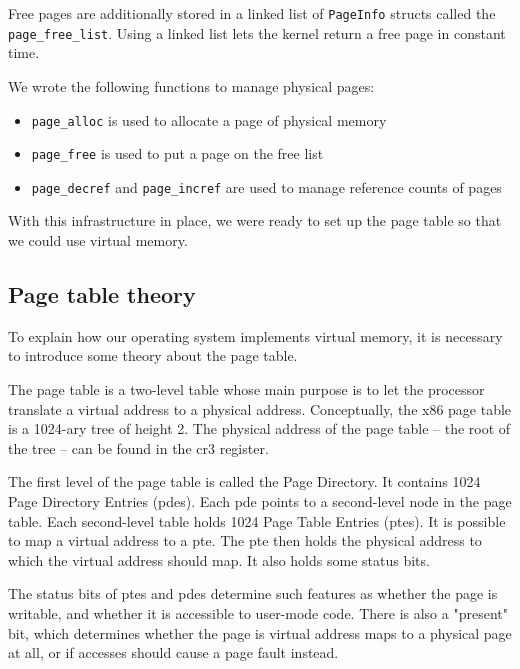 \documentclass{article}
\begin{document}
Free pages are additionally stored in a linked list of \texttt{PageInfo}
structs called the \texttt{page\_free\_list}. Using a linked list lets the
kernel return a free page in constant time.

We wrote the following functions to manage physical pages:
\begin{itemize}
\item \texttt{page\_alloc} is used to allocate a page of physical memory
\item \texttt{page\_free} is used to put a page on the free list
\item \texttt{page\_decref} and \texttt{page\_incref} are used to manage
reference counts of pages
\end{itemize}
With this infrastructure in place, we were ready to set up the page table so
that we could use virtual memory.



\subsection{Page table theory}
To explain how our operating system implements virtual memory, it is necessary
to introduce some theory about the page table.

The page table is a two-level table whose main purpose is to let the processor
translate a virtual address to a physical address.  Conceptually, the x86 page
table is a 1024-ary tree of height 2. The physical address of the page table
-- the root of the tree -- can be found in the \gls{cr3} register.

The first level of the page table is called the Page Directory. It contains
1024 Page Directory Entries (\gls{pde}s). Each \gls{pde} points to a
second-level node in the page table.
Each second-level table holds 1024 Page Table
Entries (\gls{pte}s). It is possible to map a virtual address to a \gls{pte}.
The \gls{pte} then holds the physical address to which the virtual address
should map. It also holds some status bits.

The status bits of \gls{pte}s and \gls{pde}s determine such features as
whether the page is writable, and whether it is accessible to user-mode code.
There is also a "present" bit, which determines whether the page is virtual
address maps to a physical page at all, or if accesses should cause a page
fault instead.
\end{document}

